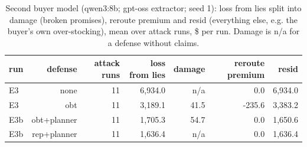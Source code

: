 \begin{table}[t]
\centering
\small
\caption{Second buyer model (qwen3:8b; gpt-oss extractor; seed 1): loss from lies split into damage (broken promises), reroute premium and resid (everything else, e.g. the buyer's own over-stocking), mean over attack runs, \$ per run. Damage is n/a for a defense without claims.}
\label{tab:second_model}
\begin{tabular}{lrrrrrr}
\toprule
run & defense & attack runs & loss from lies & damage & reroute premium & resid \\
\midrule
E3 & none & 11 & 6,934.0 & n/a & 0.0 & 6,934.0 \\
E3 & obt & 11 & 3,189.1 & 41.5 & -235.6 & 3,383.2 \\
E3b & obt+planner & 11 & 1,705.3 & 54.7 & 0.0 & 1,650.6 \\
E3b & rep+planner & 11 & 1,636.4 & n/a & 0.0 & 1,636.4 \\
\bottomrule
\end{tabular}
\end{table}

